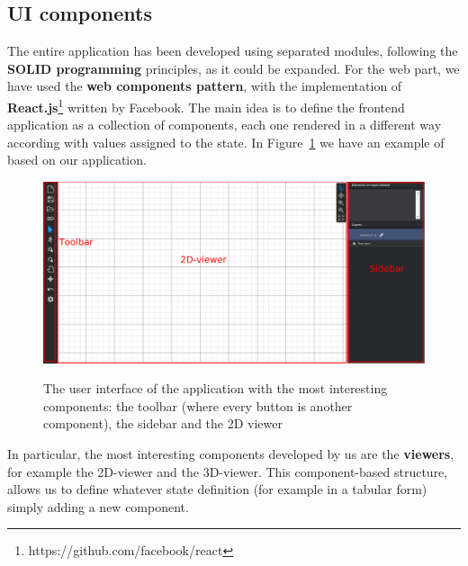 \subsection{UI components}\label{sec:ui_components}

The entire application has been developed using separated modules, following the \textbf{SOLID programming} principles, as it could be expanded. For the web part, we have used the \textbf{web components pattern}, with the implementation of \textbf{React.js}\footnote{https://github.com/facebook/react} written by Facebook. The main idea is to define the frontend application as a collection of components, each one rendered in a different way according with values assigned to the state. In Figure~\ref{fig_ui} we have an example of based on our application.\\

\begin{figure}[h]
\centering
\includegraphics[width=0.65\linewidth]{contents/images/ui}\\
\caption{The user interface of the application with the most interesting components: the toolbar (where every button is another component), the sidebar and the 2D viewer}
\label{fig_ui}
\end{figure}

In particular, the most interesting components developed by us are the \textbf{viewers}, for example the 2D-viewer and the 3D-viewer. This component-based structure, allows us to define whatever state definition (for example in a tabular form) simply adding a new component.\\

